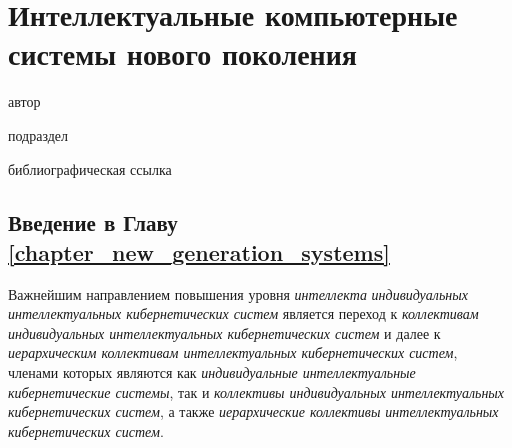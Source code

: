 \chapter{Интеллектуальные компьютерные системы нового поколения}
\label{chapter_new_generation_systems} 

\vspace{-7\baselineskip}

\begin{SCn}
\begin{scnrelfromlist}{автор}
\end{scnrelfromlist}

\bigskip


\bigskip

\begin{scnrelfromlist}{подраздел}
\end{scnrelfromlist}

\bigskip

\begin{scnrelfromlist}{библиографическая ссылка}
\end{scnrelfromlist}

\end{SCn}

\section*{Введение в Главу \ref{chapter_new_generation_systems}}

Важнейшим направлением повышения уровня \textit{интеллекта} \textit{индивидуальных интеллектуальных кибернетических систем} является переход к \textit{коллективам индивидуальных интеллектуальных кибернетических систем} и далее к \textit{иерархическим коллективам интеллектуальных кибернетических систем}, членами которых являются как \textit{индивидуальные интеллектуальные кибернетические системы}, так и \textit{коллективы индивидуальных интеллектуальных кибернетических систем}, а также \textit{иерархические коллективы интеллектуальных кибернетических систем}. 

